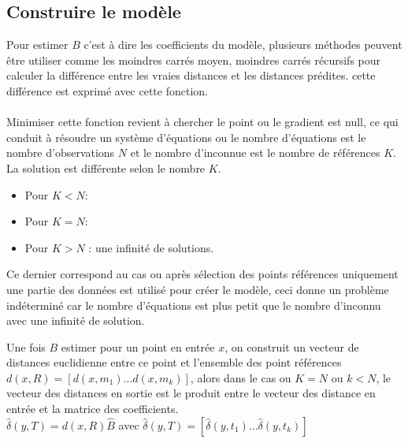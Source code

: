 \documentclass[12pt,a4paper]{report}
\begin{document}
\subsection{Construire le modèle}
\par Pour estimer $B$ c'est à dire les coefficients du modèle, plusieurs méthodes peuvent être utiliser comme les moindres carrés moyen, moindres carrés récursifs pour calculer la différence entre les vraies distances et les distances prédites. cette différence est exprimé avec cette fonction.\\ \\
Minimiser cette fonction revient à chercher le point ou le gradient est null, ce qui conduit à résoudre un système d'équations ou le nombre d'équations est le nombre d'observations $N$ et le nombre d'inconnue est le nombre de références $K$. La solution est différente selon le nombre $K$.\\
\begin{itemize}
\item Pour $K < N$: 
\item Pour $K = N$: 
\item Pour $K > N$ : une infinité de solutions.
\end{itemize}

Ce dernier correspond au cas ou après sélection des points références uniquement une partie des données est utilisé pour créer le modèle, ceci donne un problème indéterminé car le nombre d'équations est plus petit que le nombre d'inconnu avec une infinité de solution. 

\par Une fois $B$ estimer pour un point en entrée $x$, on construit un vecteur de distances euclidienne entre ce point et l'ensemble des point références $d(x,R) = [d(x,m_1)...d(x,m_k)]$, alors dans le cas ou $K = N$ ou $k < N$, le vecteur des distances en sortie est le produit entre le vecteur des distance en entrée et la matrice des coefficients.\\
$\hat{\delta}(y,T) = d(x,R)\hat{B}$ avec $\hat{\delta}(y,T) = [\hat{\delta}(y,t_1)...\hat{\delta}(y,t_k)]$
\end{document}
